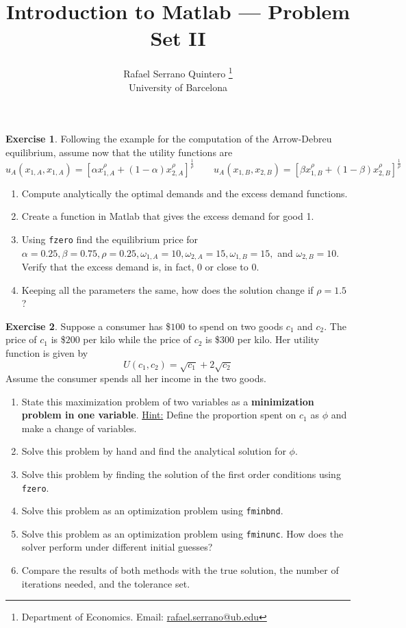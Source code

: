 \documentclass[a4paper,11pt]{article}
\title{\textbf{Introduction to Matlab --- Problem Set II}}
\author{Rafael Serrano Quintero
\thanks{Department of Economics. Email: \href{mailto:rafael.serrano@ub.edu}{rafael.serrano@ub.edu}} \\
University of Barcelona \\}
\date{}
\theoremstyle{definition}
\newtheorem{exercise}{Exercise}
\begin{document}
\VerbatimFootnotes

\maketitle

\begin{exercise}
  Following the example for the computation of the Arrow-Debreu equilibrium, assume now that the utility functions are 
  \[
    u_A(x_{1,A}, x_{1,A}) = \left[ \alpha x_{1,A}^{\rho} + (1 - \alpha) x_{2,A}^{\rho} \right]^{\frac{1}{\rho} } \qquad 
    u_A(x_{1,B}, x_{2,B}) = \left[ \beta x_{1,B}^{\rho} + (1 - \beta) x_{2,B}^{\rho} \right]^{\frac{1}{\rho} }
  \]
  \begin{enumerate}
    \item Compute analytically the optimal demands and the excess demand functions. 
    \item Create a function in Matlab that gives the excess demand for good 1. 
    \item Using \verb;fzero; find the equilibrium price for $\alpha = 0.25, \beta = 0.75, \rho = 0.25, \omega_{1,A} = 10, \omega_{2,A} = 15, \omega_{1,B} = 15,$ and $\omega_{2,B} = 10$. Verify that the excess demand is, in fact, $0$ or close to $0$.
    \item Keeping all the parameters the same, how does the solution change if $\rho = 1.5$?
  \end{enumerate}
\end{exercise}

\begin{exercise}
Suppose a consumer has \$$100$ to spend on two goods $c_1$ and $c_2$. The price of $c_1$ is \$$200$ per kilo while the price of $c_2$ is \$$300$ per kilo. Her utility function is given by
\[
U(c_1, c_2) = \sqrt{c_1} + 2\sqrt{c_2}
\]
Assume the consumer spends all her income in the two goods.
\begin{enumerate}
    \item State this maximization problem of two variables as a \textbf{minimization problem in one variable}. \underline{Hint:} Define the proportion spent on $c_1$ as $\phi$ and make a change of variables.
    \item Solve this problem by hand and find the analytical solution for $\phi$.
    \item Solve this problem by finding the solution of the first order conditions using \verb;fzero;.
    \item Solve this problem as an optimization problem using \verb;fminbnd;.
    \item Solve this problem as an optimization problem using \verb;fminunc;. How does the solver perform under different initial guesses?
    \item Compare the results of both methods with the true solution, the number of iterations needed, and the tolerance set.
\end{enumerate}
\end{exercise}
\end{document}
